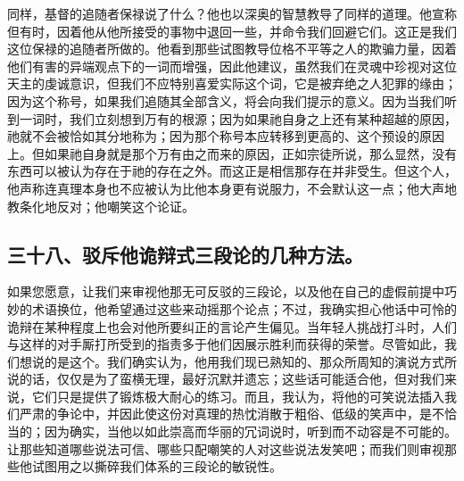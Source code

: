 同样，基督的追随者保禄说了什么？他也以深奥的智慧教导了同样的道理。他宣称但有时，因着他从他所接受的事物中退回一些，并命令我们回避它们。这正是我们这位保禄的追随者所做的。他看到那些试图教导位格不平等之人的欺骗力量，因着他们有害的异端观点下的一词而增强，因此他建议，虽然我们在灵魂中珍视对这位天主的虔诚意识，但我们不应特别喜爱实际这个词，它是被弃绝之人犯罪的缘由；因为这个称号，如果我们追随其全部含义，将会向我们提示的意义。因为当我们听到一词时，我们立刻想到万有的根源；因为如果祂自身之上还有某种超越的原因，祂就不会被恰如其分地称为；因为那个称号本应转移到更高的、这个预设的原因上。但如果祂自身就是那个万有由之而来的原因，正如宗徒所说，那么显然，没有东西可以被认为存在于祂的存在之外。而这正是相信那存在并非受生。但这个人，他声称连真理本身也不应被认为比他本身更有说服力，不会默认这一点；他大声地教条化地反对；他嘲笑这个论证。\par


\subsection{三十八、驳斥他诡辩式三段论的几种方法。}

如果您愿意，让我们来审视他那无可反驳的三段论，以及他在自己的虚假前提中巧妙的术语换位，他希望通过这些来动摇那个论点；不过，我确实担心他话中可怜的诡辩在某种程度上也会对他所要纠正的言论产生偏见。当年轻人挑战打斗时，人们与这样的对手厮打所受到的指责多于他们因展示胜利而获得的荣誉。尽管如此，我们想说的是这个。我们确实认为，他用我们现已熟知的、那众所周知的演说方式所说的话，仅仅是为了蛮横无理，最好沉默并遗忘；这些话可能适合他，但对我们来说，它们只是提供了锻炼极大耐心的练习。而且，我认为，将他的可笑说法插入我们严肃的争论中，并因此使这份对真理的热忱消散于粗俗、低级的笑声中，是不恰当的；因为确实，当他以如此崇高而华丽的冗词说时，听到而不动容是不可能的。让那些知道哪些说法可信、哪些只配嘲笑的人对这些说法发笑吧；而我们则审视那些他试图用之以撕碎我们体系的三段论的敏锐性。\par

